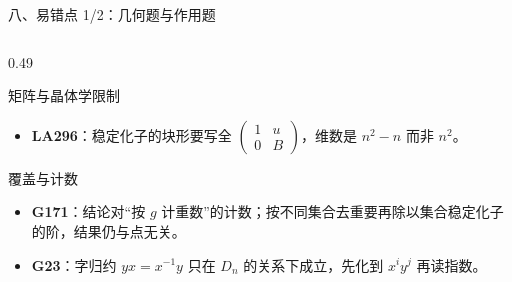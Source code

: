 \documentclass[aspectratio=169,10pt,fontset=none]{ctexbeamer}
\newcommand{\ex}[1]{\textcolor{accent}{\footnotesize\bfseries #1}}
\begin{document}
\begin{frame}[t]{八、易错点 1/2：几何题与作用题}
\begin{columns}[T,onlytextwidth]
\begin{column}{0.49\textwidth}
\begin{alertblock}{\footnotesize 矩阵与晶体学限制}
\begin{itemize}
          \item \ex{LA296}：稳定化子的块形要写全 $\begin{pmatrix}1&u\\0&B\end{pmatrix}$，维数是 $n^2-n$ 而非 $n^2$。
        \end{itemize}
      \end{alertblock}
      \begin{alertblock}{\footnotesize 覆盖与计数}
        \scriptsize
        \begin{itemize}\setlength{\itemsep}{1pt}
          \item \ex{G171}：结论对“按 $g$ 计重数”的计数；按不同集合去重要再除以集合稳定化子的阶，结果仍与点无关。
          \item \ex{G23}：字归约 $yx=x^{-1}y$ 只在 $D_n$ 的关系下成立，先化到 $x^iy^j$ 再读指数。
        \end{itemize}
      \end{alertblock}
    \end{column}
  \end{columns}
\end{frame}
\end{document}
